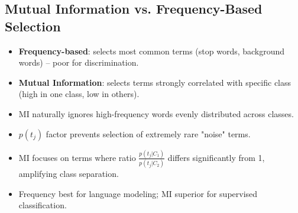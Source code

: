 \subsection*{Mutual Information vs. Frequency-Based Selection}

\begin{itemize}
    \item \textbf{Frequency-based}: selects most common terms (stop words, background words) -- poor for discrimination.
    \item \textbf{Mutual Information}: selects terms strongly correlated with specific class (high in one class, low in others).
    \item MI naturally ignores high-frequency words evenly distributed across classes.
    \item $p(t_j)$ factor prevents selection of extremely rare "noise" terms.
    \item MI focuses on terms where ratio $\frac{p(t_j|C_1)}{p(t_j|C_2)}$ differs significantly from 1, amplifying class separation.
    \item Frequency best for language modeling; MI superior for supervised classification.
\end{itemize}

